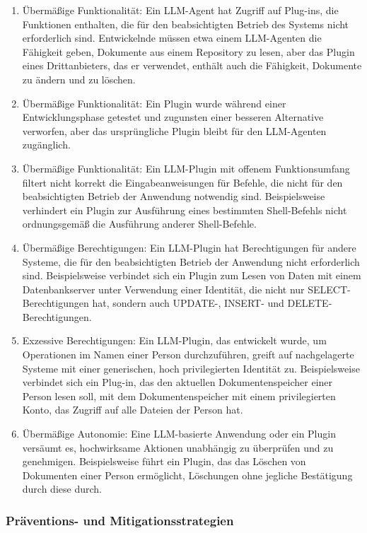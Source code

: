 \documentclass[
]{article}
\providecommand{\tightlist}{%
  \setlength{\itemsep}{0pt}\setlength{\parskip}{0pt}}
\begin{document}
\begin{enumerate}
\def\labelenumi{\arabic{enumi}.}
\tightlist
\item
  Übermäßige Funktionalität: Ein LLM-Agent hat Zugriff auf Plug-ins, die
  Funktionen enthalten, die für den beabsichtigten Betrieb des Systems
  nicht erforderlich sind. Entwickelnde müssen etwa einem LLM-Agenten
  die Fähigkeit geben, Dokumente aus einem Repository zu lesen, aber das
  Plugin eines Drittanbieters, das er verwendet, enthält auch die
  Fähigkeit, Dokumente zu ändern und zu löschen.
\item
  Übermäßige Funktionalität: Ein Plugin wurde während einer
  Entwicklungsphase getestet und zugunsten einer besseren Alternative
  verworfen, aber das ursprüngliche Plugin bleibt für den LLM-Agenten
  zugänglich.
\item
  Übermäßige Funktionalität: Ein LLM-Plugin mit offenem Funktionsumfang
  filtert nicht korrekt die Eingabeanweisungen für Befehle, die nicht
  für den beabsichtigten Betrieb der Anwendung notwendig sind.
  Beispielsweise verhindert ein Plugin zur Ausführung eines bestimmten
  Shell-Befehls nicht ordnungsgemäß die Ausführung anderer
  Shell-Befehle.
\item
  Übermäßige Berechtigungen: Ein LLM-Plugin hat Berechtigungen für
  andere Systeme, die für den beabsichtigten Betrieb der Anwendung nicht
  erforderlich sind. Beispielsweise verbindet sich ein Plugin zum Lesen
  von Daten mit einem Datenbankserver unter Verwendung einer Identität,
  die nicht nur SELECT-Berechtigungen hat, sondern auch UPDATE-, INSERT-
  und DELETE-Berechtigungen.
\item
  Exzessive Berechtigungen: Ein LLM-Plugin, das entwickelt wurde, um
  Operationen im Namen einer Person durchzuführen, greift auf
  nachgelagerte Systeme mit einer generischen, hoch privilegierten
  Identität zu. Beispielsweise verbindet sich ein Plug-in, das den
  aktuellen Dokumentenspeicher einer Person lesen soll, mit dem
  Dokumentenspeicher mit einem privilegierten Konto, das Zugriff auf
  alle Dateien der Person hat.
\item
  Übermäßige Autonomie: Eine LLM-basierte Anwendung oder ein Plugin
  versäumt es, hochwirksame Aktionen unabhängig zu überprüfen und zu
  genehmigen. Beispielsweise führt ein Plugin, das das Löschen von
  Dokumenten einer Person ermöglicht, Löschungen ohne jegliche
  Bestätigung durch diese durch.
\end{enumerate}

\subsubsection{Präventions- und
Mitigationsstrategien}\label{pruxe4ventions--und-mitigationsstrategien}
\end{document}

